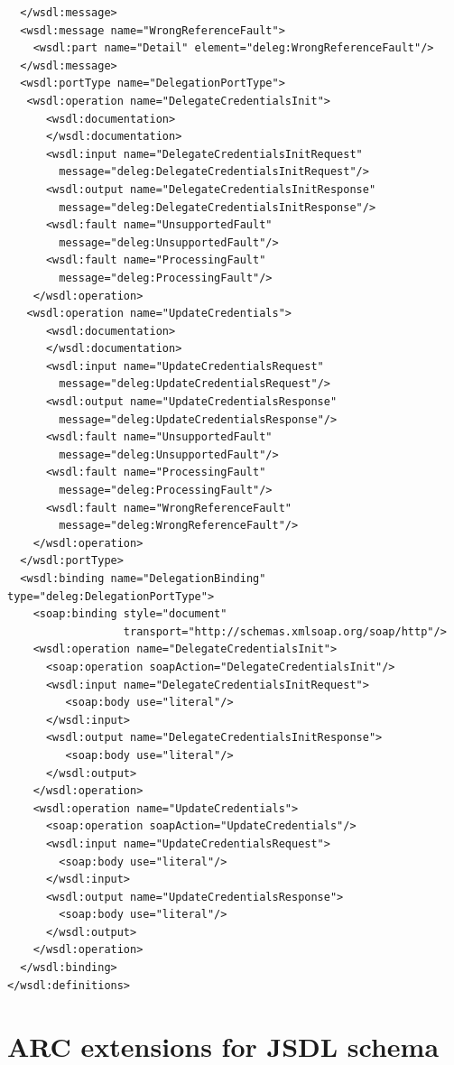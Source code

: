 \documentclass{article}                            %
\begin{document}
\begin{footnotesize}
\begin{verbatim}
  </wsdl:message>
  <wsdl:message name="WrongReferenceFault">
    <wsdl:part name="Detail" element="deleg:WrongReferenceFault"/>
  </wsdl:message>
  <wsdl:portType name="DelegationPortType">
   <wsdl:operation name="DelegateCredentialsInit">
      <wsdl:documentation>
      </wsdl:documentation>
      <wsdl:input name="DelegateCredentialsInitRequest"
        message="deleg:DelegateCredentialsInitRequest"/>
      <wsdl:output name="DelegateCredentialsInitResponse"
        message="deleg:DelegateCredentialsInitResponse"/>
      <wsdl:fault name="UnsupportedFault"
        message="deleg:UnsupportedFault"/>
      <wsdl:fault name="ProcessingFault"
        message="deleg:ProcessingFault"/>
    </wsdl:operation>
   <wsdl:operation name="UpdateCredentials">
      <wsdl:documentation>
      </wsdl:documentation>
      <wsdl:input name="UpdateCredentialsRequest"
        message="deleg:UpdateCredentialsRequest"/>
      <wsdl:output name="UpdateCredentialsResponse"
        message="deleg:UpdateCredentialsResponse"/>
      <wsdl:fault name="UnsupportedFault"
        message="deleg:UnsupportedFault"/>
      <wsdl:fault name="ProcessingFault"
        message="deleg:ProcessingFault"/>
      <wsdl:fault name="WrongReferenceFault"
        message="deleg:WrongReferenceFault"/>
    </wsdl:operation>
  </wsdl:portType>
  <wsdl:binding name="DelegationBinding" type="deleg:DelegationPortType">
    <soap:binding style="document"
                  transport="http://schemas.xmlsoap.org/soap/http"/>
    <wsdl:operation name="DelegateCredentialsInit">
      <soap:operation soapAction="DelegateCredentialsInit"/>
      <wsdl:input name="DelegateCredentialsInitRequest">
         <soap:body use="literal"/>
      </wsdl:input>
      <wsdl:output name="DelegateCredentialsInitResponse">
         <soap:body use="literal"/>
      </wsdl:output>
    </wsdl:operation>
    <wsdl:operation name="UpdateCredentials">
      <soap:operation soapAction="UpdateCredentials"/>
      <wsdl:input name="UpdateCredentialsRequest">
        <soap:body use="literal"/>
      </wsdl:input>
      <wsdl:output name="UpdateCredentialsResponse">
        <soap:body use="literal"/>
      </wsdl:output>
    </wsdl:operation>
  </wsdl:binding>
</wsdl:definitions>
\end{verbatim}
\end{footnotesize}

\section{ARC extensions for JSDL schema\label{annex:jsdl-extension}}
\end{document}
